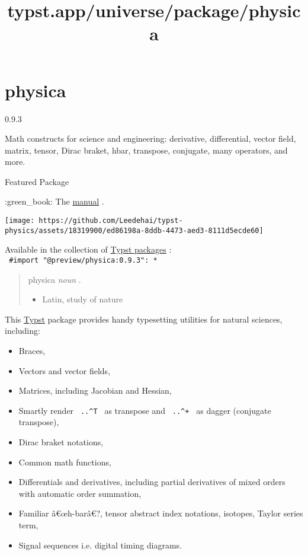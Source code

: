 \title{typst.app/universe/package/physica}

\label{banner}
\section{physica}\label{physica}

{ 0.9.3 }

Math constructs for science and engineering: derivative, differential,
vector field, matrix, tensor, Dirac braket, hbar, transpose, conjugate,
many operators, and more.

{ } Featured Package

\label{readme}
:green\_book: The
\href{https://github.com/Leedehai/typst-physics/blob/v0.9.3/physica-manual.pdf}{manual}
.

\texttt{[image: https://github.com/Leedehai/typst-physics/assets/18319900/ed86198a-8ddb-4473-aed3-8111d5ecde60]}

\href{https://github.com/Leedehai/typst-physics/actions/workflows/ci.yml}{\pandocbounded{}}
\href{https://github.com/Leedehai/typst-physics/releases/latest}{\pandocbounded{\texttt{[image: https://img.shields.io/github/v/release/Leedehai/typst-physics.svg?color=gold]}}}

Available in the collection of
\href{https://typst.app/docs/packages/}{Typst packages} :
\texttt{\ \#import\ "@preview/physica:0.9.3":\ *\ }

\begin{quote}
physica \emph{noun} .

\begin{itemize}
\tightlist
\item
  Latin, study of nature
\end{itemize}
\end{quote}

This \href{https://typst.app/}{Typst} package provides handy typesetting
utilities for natural sciences, including:

\begin{itemize}
\tightlist
\item
  Braces,
\item
  Vectors and vector fields,
\item
  Matrices, including Jacobian and Hessian,
\item
  Smartly render \texttt{\ ..\^{}T\ } as transpose and
  \texttt{\ ..\^{}+\ } as dagger (conjugate transpose),
\item
  Dirac braket notations,
\item
  Common math functions,
\item
  Differentials and derivatives, including partial derivatives of mixed
  orders with automatic order summation,
\item
  Familiar â€œh-barâ€?, tensor abstract index notations, isotopes,
  Taylor series term,
\item
  Signal sequences i.e. digital timing diagrams.
\end{itemize}

